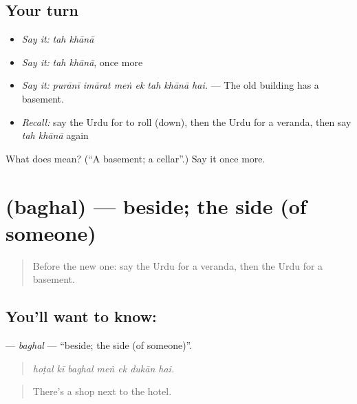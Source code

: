 \subsection*{Your turn}
\begin{itemize}
\raggedright
  \item \emph{Say it:} \emph{tah khānā}
  \item \emph{Say it:} \emph{tah khānā}, once more
  \item \emph{Say it:} \emph{purānī imārat meṅ ek tah khānā hai.} — The old building has a basement.
  \item \emph{Recall:} say the Urdu for to roll (down), then the Urdu for a veranda, then say \emph{tah khānā} again
\end{itemize}

\begin{tcolorbox}[breakable,colback=teal!4,colframe=teal!35!black,title={Before you move on}]
What does   mean? (\textquotedblleft{}A basement; a cellar\textquotedblright{}.) Say it once more.
\end{tcolorbox}
\section[\texorpdfstring{\ur{بغل} (baghal)}{بغل (baghal)}]{ (baghal) — beside; the side (of someone)}

\label{lesson:UR-C411-baghal}



\begin{quote}
Before the new one: say the Urdu for a veranda, then the Urdu for a basement.
\end{quote}

\subsection*{You'll want to know: }
\textbf{} — \emph{baghal} — \textquotedblleft{}beside; the side (of someone)\textquotedblright{}.

\begin{quote}
      
\end{quote}

\begin{quote}
\emph{hoṭal kī baghal meṅ ek dukān hai.}
\end{quote}

\begin{quote}
There's a shop next to the hotel.
\end{quote}

